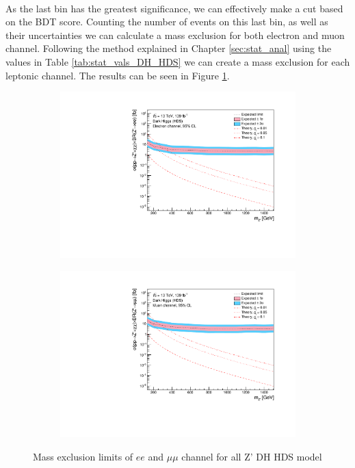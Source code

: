 \documentclass[12pt, a4paper]{book}
\begin{document}
\\As the last bin has the greatest significance, we can effectively make a cut based on the BDT score. Counting the number of events on this last bin, as well as their uncertainties we can calculate a mass exclusion for both electron and muon channel. 
Following the method explained in Chapter \ref{sec:stat_anal} using the values in Table \ref{tab:stat_vals_DH_HDS} we can create a mass exclusion for each leptonic channel. The results can be seen in Figure \ref{fig:DH_HDS_exclusion_ee_uu}.
\clearpage
\begin{figure}[!ht]
	\centering
   \begin{subfigure}[b]{0.49\textwidth}
      \centering
      \includegraphics[width=1\textwidth]{Limits/DH_HDS/mass_exclusion_ee.pdf}
      \end{subfigure}
   \hfill
   \begin{subfigure}[b]{0.49\textwidth}
      \centering
      \includegraphics[width=1\textwidth]{Limits/DH_HDS/mass_exclusion_uu.pdf}
      \end{subfigure}
   \caption{Mass exclusion limits of $ee$ and $\mu\mu$ channel for all Z' DH HDS model}\label{fig:DH_HDS_exclusion_ee_uu}
\end{figure}
\end{document}
